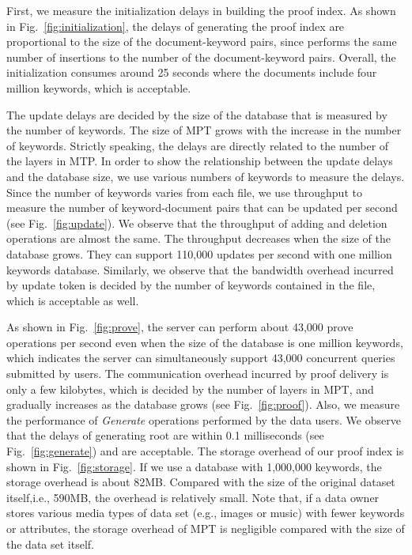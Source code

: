 First, we measure the initialization delays in building the proof index. As shown in Fig.~\ref{fig:initialization}, the delays of generating the proof index are proportional to the size of the document-keyword pairs, since \name performs the same number of insertions to the number of the document-keyword pairs. Overall, the initialization consumes around 25 seconds where the documents include four million keywords, which is acceptable.

The update delays are decided by the size of the database that is measured by the number of keywords. The size of MPT grows with the increase in the number of keywords. Strictly speaking, the delays are directly related to the number of the layers in MTP. In order to show the relationship between the update delays and the database size, we use various numbers of keywords to measure the delays. Since the number of keywords varies from each file, we use throughput to measure the number of keyword-document pairs that can be updated per second (see Fig.~\ref{fig:update}). We observe that the throughput of adding and deletion operations are almost the same. The throughput decreases when the size of the database grows. They can support 110,000 updates per second with one million keywords database.
Similarly, we observe that the bandwidth overhead incurred by update token is decided by the number of keywords contained in the file, which is acceptable as well.

As shown in Fig.~\ref{fig:prove}, the server can perform about 43,000 prove operations per second even when the size of the database is one million keywords, which indicates the server can simultaneously support 43,000 concurrent queries submitted by users.
The communication overhead incurred by proof delivery is only a few kilobytes, which is decided by the number of layers in MPT, and gradually increases as the database grows (see Fig.~\ref{fig:proof}). Also, we measure the performance of {\it Generate} operations performed by the data users.
We observe that the delays of generating root are within 0.1 milliseconds (see Fig.~\ref{fig:generate}) and are acceptable. The storage overhead of our proof index is shown in Fig.~\ref{fig:storage}. If we use a database with 1,000,000 keywords, the storage overhead is about 82MB. Compared with the size of the original dataset itself,i.e., 590MB, the overhead is relatively small. Note that, if a data owner stores various media types of data set (e.g., images or music) with fewer keywords or attributes, the storage overhead of MPT is negligible compared with the size of the data set itself.

